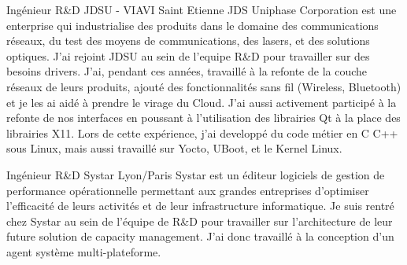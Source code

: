\documentclass[11pt,a4paper,sans]{moderncv}
\begin{document}
{Ing\'enieur R\&D}
{JDSU - VIAVI}
{Saint Etienne}
{}
{JDS Uniphase Corporation est une enterprise qui industrialise des produits
dans le domaine des communications r\'eseaux, du test des moyens de
communications, des lasers, et des solutions optiques.
J'ai rejoint JDSU au sein de l'equipe R\&D pour travailler sur des besoins
drivers. J'ai, pendant ces ann\'ees, travaill\'e \`a la refonte de la couche
r\'eseaux de leurs produits, ajout\'e des fonctionnalit\'es sans fil
(Wireless, Bluetooth) et je les ai aid\'e \`a prendre le virage du Cloud.
J'ai aussi activement particip\'e \`a la refonte de nos interfaces en poussant
\`a l'utilisation des librairies Qt \`a la place des librairies X11.
Lors de cette exp\'erience, j'ai developp\'e du code m\'etier en C C++ sous
Linux, mais aussi travaill\'e sur Yocto, UBoot, et le Kernel Linux.
}

{Ing\'enieur R\&D}
{Systar}
{Lyon/Paris}
{}
{Systar est un \'editeur logiciels de gestion de performance 
op\'erationnelle permettant aux grandes entreprises d'optimiser l'efficacit\'e
de leurs activit\'es et de leur infrastructure informatique. 
Je suis rentr\'e chez Systar au sein de l'\'equipe de R\&D pour travailler sur 
l'architecture de leur future solution de capacity management. J'ai donc
travaill\'e \`a la conception d'un agent syst\`eme multi-plateforme.
}
\end{document}
